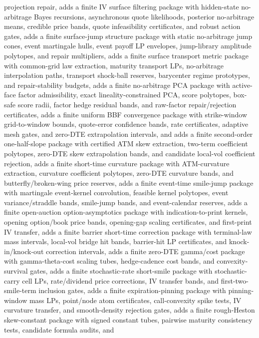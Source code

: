 \documentclass[11pt]{article}
\begin{document}
projection repair, adds a finite IV surface filtering package with hidden-state
no-arbitrage Bayes recursions, asynchronous quote likelihoods, posterior
no-arbitrage means, credible price bands, quote infeasibility certificates, and
robust action gates, adds a finite surface-jump structure package with static
no-arbitrage jump cones, event martingale hulls, event payoff LP envelopes,
jump-library amplitude polytopes, and repair multipliers, adds a finite surface
transport metric package with common-grid law extraction, maturity transport LPs,
no-arbitrage interpolation paths, transport shock-ball reserves, barycenter
regime prototypes, and repair-stability budgets, adds a finite no-arbitrage PCA
package with active-face factor admissibility, exact lineality-constrained PCA,
score polytopes, box-safe score radii, factor hedge residual bands, and raw-factor
repair/rejection certificates, adds a finite uniform BBF convergence package with
strike-window grid-to-window bounds, quote-error confidence bands, rate
certificates, adaptive mesh gates, and zero-DTE extrapolation intervals, and
adds a finite second-order one-half-slope package with certified ATM skew extraction,
two-term coefficient polytopes, zero-DTE skew extrapolation bands, and candidate
local-vol coefficient rejection, adds a finite short-time curvature package with
ATM-curvature extraction, curvature coefficient polytopes, zero-DTE curvature
bands, and butterfly/broken-wing price reserves, adds a finite event-time smile-jump
package with martingale event-kernel convolution, feasible kernel polytopes,
event variance/straddle bands, smile-jump bands, and event-calendar reserves, adds
a finite open-auction option-asymptotics package with indication-to-print kernels,
opening option/book price bands, opening-gap scaling certificates, and first-print
IV transfer, adds a finite barrier short-time correction package with terminal-law
mass intervals, local-vol bridge hit bands, barrier-hit LP certificates, and
knock-in/knock-out correction intervals, adds a finite zero-DTE gamma/cost package
with gamma-theta-cost scaling tubes, hedge-cadence cost bands, and
convexity-survival gates, adds a finite stochastic-rate short-smile package with
stochastic-carry cell LPs, rate/dividend price corrections, IV transfer bands, and
first-two-smile-term inclusion gates, adds a finite expiration-pinning package with
pinning-window mass LPs, point/node atom certificates, call-convexity spike tests, IV curvature
transfer, and smooth-density rejection gates, adds a finite rough-Heston skew-constant package with
signed constant tubes, pairwise maturity consistency tests, candidate formula audits, and
\end{document}
